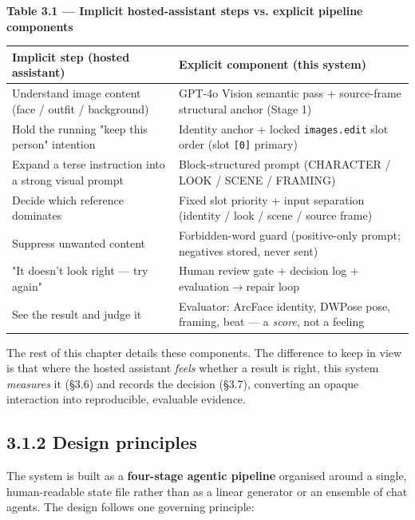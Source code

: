 \documentclass[10pt,twocolumn,letterpaper]{article}
\begin{document}
\begin{table}[t]
\centering
{\footnotesize\textbf{\textbf{Table 3.1 --- Implicit hosted-assistant steps vs. explicit pipeline components}}}\par\vspace{3pt}
\footnotesize
\begin{tabularx}{\textwidth}{>{\RaggedRight\arraybackslash}X>{\RaggedRight\arraybackslash}X}
\toprule
Implicit step (hosted assistant) & Explicit component (this system) \\
\midrule
Understand image content (face / outfit / background) & GPT-4o Vision semantic pass + source-frame structural anchor (Stage 1) \\
Hold the running "keep this person" intention & Identity anchor + locked \texttt{images.edit} slot order (slot \texttt{[0]} primary) \\
Expand a terse instruction into a strong visual prompt & Block-structured prompt (CHARACTER / LOOK / SCENE / FRAMING) \\
Decide which reference dominates & Fixed slot priority + input separation (identity / look / scene / source frame) \\
Suppress unwanted content & Forbidden-word guard (positive-only prompt; negatives stored, never sent) \\
"It doesn't look right --- try again" & Human review gate + decision log + evaluation$\rightarrow$repair loop \\
See the result and judge it & Evaluator: ArcFace identity, DWPose pose, framing, beat --- a \emph{score}, not a feeling \\
\bottomrule
\end{tabularx}
\end{table}

The rest of this chapter details these components. The difference to keep in view is that where the hosted assistant \emph{feels} whether a result is right, this system \emph{measures} it (\S{}3.6) and records the decision (\S{}3.7), converting an opaque interaction into reproducible, evaluable evidence.


\subsection*{3.1.2 Design principles}

The system is built as a \textbf{four-stage agentic pipeline} organised around a single, human-readable state file rather than as a linear generator or an ensemble of chat agents. The design follows one governing principle:
\end{document}
